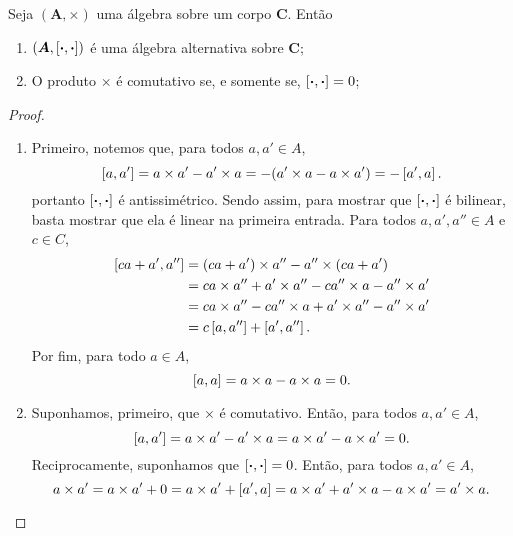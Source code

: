 \begin{proposition}
Seja $(\bm A,\times)$ uma álgebra sobre um corpo $\bm C$. Então
	\begin{enumerate}
	\item $(\bm A,\left[{\bm{\cdot}},{\bm{\cdot}}\right])$ é uma álgebra alternativa sobre $\bm C$;
	\item O produto $\times$ é comutativo se, e somente se, $\left[{\bm{\cdot}},{\bm{\cdot}}\right] = 0$;
	\end{enumerate}
\end{proposition}
\begin{proof}
	\begin{enumerate}
	\item Primeiro, notemos que, para todos $a,a' \in A$,
		\begin{equation*}
		\left[{a},{a'}\right] = a \times a' - a' \times a = -(a' \times a - a \times a') = -\left[{a'},{a}\right].
		\end{equation*}
	portanto $\left[{\bm{\cdot}},{\bm{\cdot}}\right]$ é antissimétrico. Sendo assim, para mostrar que $\left[{\bm{\cdot}},{\bm{\cdot}}\right]$ é bilinear, basta mostrar que ela é linear na primeira entrada. Para todos $a,a',a'' \in A$ e $c \in C$,
		\begin{align*}
		\left[{ca+a'},{a''}\right] &= (ca+a') \times a'' - a'' \times (ca+a') \\
			&= ca \times a'' + a' \times a'' - ca'' \times a - a'' \times a' \\
			&= ca \times a'' - ca'' \times a + a' \times a'' - a'' \times a' \\
			&= c\left[{a},{a''}\right] + \left[{a'},{a''}\right].
		\end{align*}
	Por fim, para todo $a \in A$,
		\begin{equation*}
		\left[{a},{a}\right] = a \times a - a \times a = 0.
		\end{equation*}

	\item Suponhamos, primeiro, que $\times$ é comutativo. Então, para todos $a,a' \in A$,
		\begin{equation*}
		\left[{a},{a'}\right] = a \times a' - a' \times a = a \times a' - a \times a' = 0.
		\end{equation*}
Reciprocamente, suponhamos que $\left[{\bm{\cdot}},{\bm{\cdot}}\right]=0$. Então, para todos $a,a' \in A$,
		\begin{equation*}
		a \times a' = a \times a' + 0 = a \times a' + \left[{a'},{a}\right] = a \times a' + a' \times a - a \times a' = a' \times a.
		\end{equation*}
	\end{enumerate}
\end{proof}



